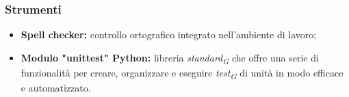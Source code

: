 \hypertarget{subsubsec:strumentiVerifica}{\subsubsection{Strumenti}}
\begin{itemize}
    \item \textbf{Spell checker:} 
        controllo ortografico integrato nell’ambiente di lavoro;
    \item \textbf{Modulo "unittest" Python:} libreria \textit{standard}\textsubscript{\textit{G}} che offre una serie di funzionalità per creare, organizzare e eseguire \textit{test}\textsubscript{\textit{G}} di unità in modo efficace e automatizzato.
\end{itemize}
